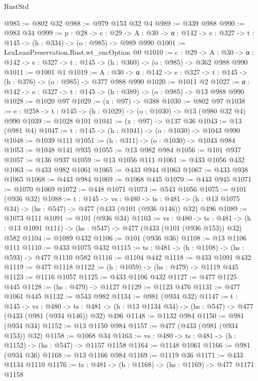 \begin{lexlean}{RustStd}
\begin{coremodule}
{\begin{coremodule}
{{{{{{{@985 := @802 @32
@988 := @979 @153 @32 @4
@989 := @339 @988
@990 := @983 @34
@999 := {p : @28} ->
  {c : @29} ->
  {A : @30} -> {α : @142} -> {e : @327} -> {t : @145} -> (h : @334) -> (o : @985) -> @989 @990
@1001 := LexLeanPreservation.Rust.wt_encOption @0
@1010 := {c : @29} ->
  {A : @30} -> {α : @142} -> {e : @327} -> {t : @145} -> (h : @360) -> (o : @985) -> @362 @988 @990
@1011 := @1001 @1
@1019 := {A : @30} ->
  {α : @142} -> {e : @327} -> {t : @145} -> (h : @376) -> (o : @985) -> @377 @988 @990
@1020 := @1011 @2
@1027 := {α : @142} -> {e : @327} -> {t : @145} -> (h : @389) -> (o : @985) -> @13 @988 @990
@1028 := @1020 @97
@1029 := (x : @97) -> @388
@1030 := @802 @97
@1038 := {e : @258} -> {t : @145} -> (h : @1029) -> (o : @1030) -> @13 (@980 @32 @4) @990
@1039 := @1028 @101
@1041 := (x : @97) -> @137 @36
@1043 := @13 (@981 @4)
@1047 := {t : @145} -> (h : @1041) -> (o : @1030) -> @1043 @990
@1048 := @1039 @111
@1051 := (h : @311) -> (o : @1030) -> @1043 @984
@1053 := @1048 @141 @935
@1055 := @13 @982 @984
@1056 := @101 @937
@1057 := @136 @937
@1059 := @13 @1056 @111
@1061 := @433 @1056 @432
@1063 := @433 @982 @1061
@1065 := @433 @944 @1063
@1067 := @433 @938 @1065
@1068 := @443 @984
@1069 := @1068 @445
@1070 := @443 @945
@1071 := @1070 @1069
@1072 := @448 @1071
@1073 := @543 @1056
@1075 := @101 (@936 @32)
@1088 := {t : @145} ->
  {vs : @480} ->
  {ts : @481} -> (h : @13 @1075 @34) -> (hs : @547) -> @477 (@433 (@101 (@936 @146)) @32) @496
@1089 := @1073 @111
@1091 := @101 (@936 @34)
@1103 := {vs : @480} ->
  {ts : @481} -> (h : @13 @1091 @111) -> (hs : @547) -> @477 (@433 (@101 (@936 @153)) @32) @582
@1104 := @1089 @432
@1106 := @101 (@936 @36)
@1108 := @13 @1106 @111
@1110 := @433 @1075 @432
@1115 := {ts : @481} -> (h : @1108) -> (hs : @593) -> @477 @1110 @582
@1116 := @1104 @442
@1118 := @433 @1091 @432
@1119 := @477 @1118
@1122 := (h : @1059) -> (hs : @479) -> @1119 @445
@1123 := @1116 @1057
@1125 := @433 @1106 @432
@1127 := @477 @1125 @445
@1128 := (hs : @479) -> @1127
@1129 := @1123 @476
@1131 := @477 @1061 @445
@1132 := @543 @982
@1134 := @981 (@934 @32)
@1147 := {t : @145} ->
  {vs : @480} ->
  {ts : @481} -> (h : @13 @1134 @34) -> (hs : @547) -> @477 (@433 (@981 (@934 @146)) @32) @496
@1148 := @1132 @984
@1150 := @981 (@934 @34)
@1152 := @13 @1150 @984
@1157 := @477 (@433 (@981 (@934 @153)) @32)
@1158 := @1068 @34
@1163 := {vs : @480} -> {ts : @481} -> (h : @1152) -> (hs : @547) -> @1157 @1158
@1164 := @1148 @1061
@1166 := @981 (@934 @36)
@1168 := @13 @1166 @984
@1169 := @1119 @36
@1171 := @433 @1134 @1110
@1176 := {ts : @481} -> (h : @1168) -> (hs : @1169) -> @477 @1171 @1158
}}}}}}}
\end{coremodule}}
\end{coremodule}
\end{lexlean}
